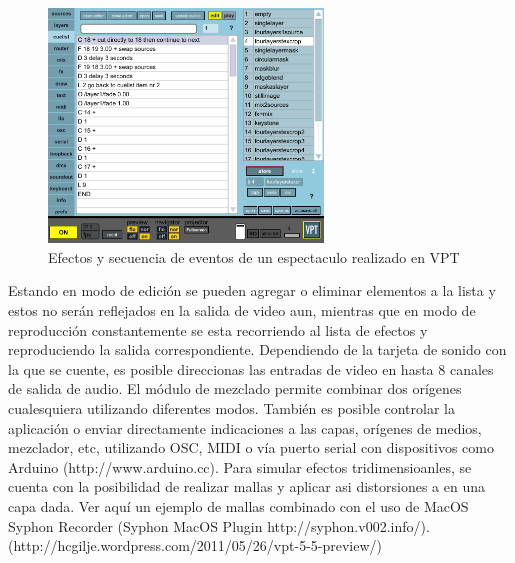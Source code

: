 \begin{figure}[H]
  \centering
    \includegraphics[width=0.65\textwidth]{./Cap3_aplicaciones/apps-vpt-cuelist.png}
  \caption{Efectos y secuencia de eventos de un espectaculo realizado en VPT}
  \label{fig:Apps-VPTCuelist}
\end{figure}

Estando en modo de edición se pueden agregar o eliminar elementos a la lista y estos no serán reflejados en la salida de video aun, mientras que en modo de reproducción constantemente se esta recorriendo al lista de efectos y reproduciendo la salida correspondiente.
Dependiendo de la tarjeta de sonido con la que se cuente, es posible direccionas las entradas de video en hasta 8 canales de salida de audio. El módulo de mezclado permite combinar dos orígenes cualesquiera utilizando diferentes modos. También es posible controlar la aplicación o enviar directamente indicaciones a las capas, orígenes de medios, mezclador, etc, utilizando OSC, MIDI o vía puerto serial con dispositivos como Arduino (http://www.arduino.cc).
Para simular efectos tridimensioanles, se cuenta con la posibilidad de realizar mallas y aplicar asi distorsiones a en una capa dada. Ver aquí un ejemplo de mallas combinado con el uso de MacOS Syphon Recorder (Syphon MacOS Plugin http://syphon.v002.info/). (http://hcgilje.wordpress.com/2011/05/26/vpt-5-5-preview/)
